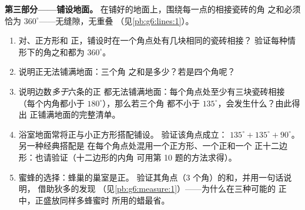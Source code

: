 \begin{problem}
\medskip
\noindent\textbf{第三部分——铺设地面。}
在铺好的地面上，围绕每一点的相接瓷砖的角
之和必须恰为 $360^\circ$——无缝隙，无重叠
（见\cref{pb:g6:lines:1}）。
\begin{enumerate}[resume]
  \item 对、正方形和
        正，铺设时在一个角点处有几块相同的瓷砖相接？
        验证每种情形下的角之和都为 $360^\circ$。
  \item 说明正无法铺满地面：三个角
        之和是多少？若是四个角呢？
  \item 说明边数\emph{多于}六条的正
        都无法铺满地面：每个角点处至少有三块瓷砖相接
        （每个内角都小于 $180^\circ$），那么若三个角
        都不小于 $135^\circ$，会发生什么？由此得出
        正铺满地面的完整清单。
  \item 浴室地面常将正与小正方形搭配铺设。
        验证该角点成立：
        $135^\circ + 135^\circ + 90^\circ$。另一种经典搭配是
        在每个角点处混用一个正方形、一个正和一个
        正十二边形：也请验证（十二边形的内角
        可用第 10 题的方法求得）。
  \item 蜜蜂的选择：蜂巢的巢室是正。
        验证其角点（$3$ 个角）的和，并用一句话说明，
        借助狄多的发现
        （见\cref{pb:g6:measure:1}）——为什么在三种可能的
        正中，正盛放同样多蜂蜜时
        所用的蜡最省。
\end{enumerate}
\end{problem}
